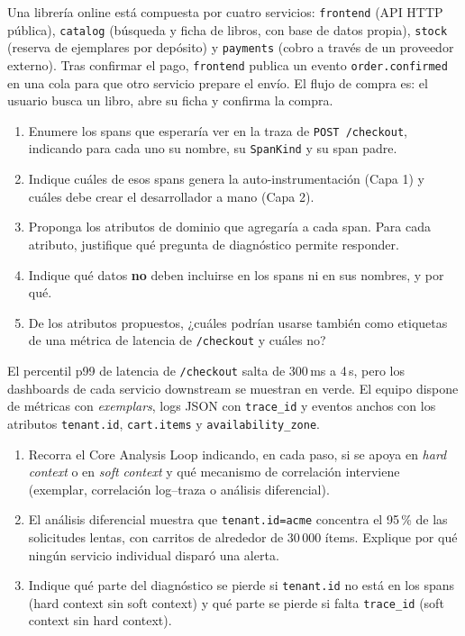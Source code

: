 \documentclass[variant=guia,cover=institutional,mode=screen]{ua-engineering-v6-article}
\begin{document}
\begin{uaexercise}
Una librería online está compuesta por cuatro servicios: \texttt{frontend} (API HTTP pública), \texttt{catalog} (búsqueda y ficha de libros, con base de datos propia), \texttt{stock} (reserva de ejemplares por depósito) y \texttt{payments} (cobro a través de un proveedor externo). Tras confirmar el pago, \texttt{frontend} publica un evento \texttt{order.confirmed} en una cola para que otro servicio prepare el envío. El flujo de compra es: el usuario busca un libro, abre su ficha y confirma la compra.
\begin{enumerate}
\item Enumere los spans que esperaría ver en la traza de \texttt{POST /checkout}, indicando para cada uno su nombre, su \texttt{SpanKind} y su span padre.
\item Indique cuáles de esos spans genera la auto-instrumentación (Capa 1) y cuáles debe crear el desarrollador a mano (Capa 2).
\item Proponga los atributos de dominio que agregaría a cada span. Para cada atributo, justifique qué pregunta de diagnóstico permite responder.
\item Indique qué datos \textbf{no} deben incluirse en los spans ni en sus nombres, y por qué.
\item De los atributos propuestos, ¿cuáles podrían usarse también como etiquetas de una métrica de latencia de \texttt{/checkout} y cuáles no?
\end{enumerate}
\end{uaexercise}

\begin{uaexercise}
El percentil p99 de latencia de \texttt{/checkout} salta de 300\,ms a 4\,s, pero los dashboards de cada servicio downstream se muestran en verde. El equipo dispone de métricas con \emph{exemplars}, logs JSON con \texttt{trace\_id} y eventos anchos con los atributos \texttt{tenant.id}, \texttt{cart.items} y \texttt{availability\_zone}.
\begin{enumerate}
\item Recorra el Core Analysis Loop indicando, en cada paso, si se apoya en \emph{hard context} o en \emph{soft context} y qué mecanismo de correlación interviene (exemplar, correlación log--traza o análisis diferencial).
\item El análisis diferencial muestra que \texttt{tenant.id=acme} concentra el 95\,\% de las solicitudes lentas, con carritos de alrededor de 30\,000 ítems. Explique por qué ningún servicio individual disparó una alerta.
\item Indique qué parte del diagnóstico se pierde si \texttt{tenant.id} no está en los spans (hard context sin soft context) y qué parte se pierde si falta \texttt{trace\_id} (soft context sin hard context).
\end{enumerate}
\end{uaexercise}
\end{document}
